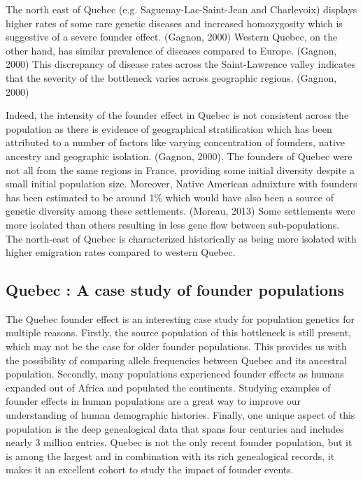\documentclass[
11pt, %
oneside, %
english, %
doublespacing, %
headsepline, %
]{MastersDoctoralThesis} %
\begin{document}
The north east of Quebec (e.g. Saguenay-Lac-Saint-Jean and Charlevoix) displays higher rates of some rare genetic diseases and increased homozygosity which is suggestive of a severe founder effect. (Gagnon, 2000)
Western Quebec, on the other hand, has similar prevalence of diseases compared to Europe. (Gagnon, 2000)
This discrepancy of disease rates across the Saint-Lawrence valley indicates that the severity of the bottleneck varies across geographic regions. (Gagnon, 2000)

Indeed, the intensity of the founder effect in Quebec is not consistent across the population as there is evidence of geographical stratification which has been attributed to a number of factors like varying concentration of founders, native ancestry and geographic isolation. (Gagnon, 2000).
The founders of Quebec were not all from the same regions in France, providing some initial diversity despite a small initial population size.
Moreover, Native American admixture with founders has been estimated to be around 1\% which would have also been a source of genetic diversity among these settlements. (Moreau, 2013)
Some settlements were more isolated than others resulting in less gene flow between sub-populations.
The north-east of Quebec is characterized historically as being more isolated with higher emigration rates compared to western Quebec.

\subsection{Quebec : A case study of founder populations}

The Quebec founder effect is an interesting case study for population genetics for multiple reasons.
Firstly, the source population of this bottleneck is still present, which may not be the case for older founder populations. 
This provides us with the possibility of comparing allele frequencies between Quebec and its ancestral population.
Secondly, many populations experienced founder effects as humans expanded out of Africa and populated the continents.
Studying examples of founder effects in human populations are a great way to improve our understanding of human demographic histories.
Finally, one unique aspect of this population is the deep genealogical data that spans four centuries and includes nearly 3 million entries.
Quebec is not the only recent founder population, but it is among the largest and in combination with its rich genealogical records, it makes it an excellent cohort to study the impact of founder events.
\end{document}
